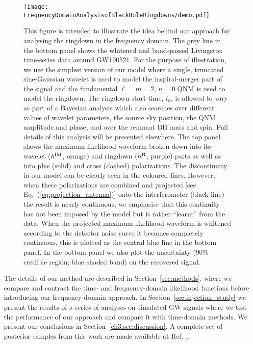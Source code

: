 \begin{figure}[t!]
    \centering
    \texttt{[image: FrequencyDomainAnalysisofBlackHoleRingdowns/demo.pdf]}
    \caption[Illustration of the frequency-domain analysis method]{ 
    This figure is intended to illustrate the idea behind our approach for analysing the ringdown in the frequency domain.
    The grey line in the bottom panel shows the whitened and band-passed Livingston time-series data around GW190521. %
    For the purpose of illustration, we use the simplest version of our model where a single, truncated sine-Gaussian wavelet is used to model the inspiral-merger part of the signal and the fundamental $\ell=m=2$, $n=0$ QNM is used to model the ringdown.
    The ringdown start time, $t_0$, is allowed to vary as part of a Bayesian analysis which also searches over different values of wavelet parameters, the source sky position, the QNM amplitude and phase, and over the remnant BH mass and spin. 
    Full details of this analysis will be presented elsewhere.
    The top panel shows the maximum likelihood waveform broken down into its wavelet ($h^{\rm IM}$, orange) and ringdown ($h^{\rm R}$, purple) parts as well as into plus (solid) and cross (dashed) polarizations. 
    The discontinuity in our model can be clearly seen in the coloured lines. 
    However, when these polarizations are combined and projected [see Eq.~(\ref{eq:projection_antenna})] onto the interferometer (black line) the result is nearly continuous; we emphasise that this continuity has not been imposed by the model but is rather ``learnt'' from the data. When the projected maximum likelihood waveform is whitened according to the detector noise curve it becomes completely continuous, this is plotted as the central blue line in the bottom panel.
    In the bottom panel we also plot the uncertainty (90\% credible region; blue shaded band) on the recovered signal.
    }
    \label{fig:demo}
\end{figure}

The details of our method are described in Section~\ref{sec:methods}, where we compare and contrast the time- and frequency-domain likelihood functions before introducing our frequency-domain approach.
In Section~\ref{sec:injection_study} we present the results of a series of analyses on simulated GW signals where we test the performance of our approach and compare it with time-domain methods.
We present our conclusions in Section~\ref{ch3:sec:discussion}.
A complete set of posterior samples from this work are made available at Ref.~\cite{finch_eliot_2021_5569759}.


